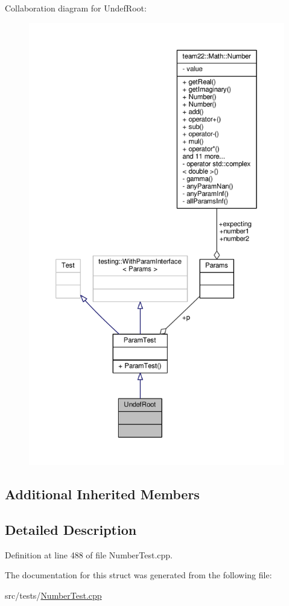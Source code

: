 Collaboration diagram for Undef\+Root\+:
\nopagebreak
\begin{figure}[H]
\begin{center}
\leavevmode
\includegraphics[height=550pt]{struct_undef_root__coll__graph}
\end{center}
\end{figure}
\subsection*{Additional Inherited Members}


\subsection{Detailed Description}


Definition at line 488 of file Number\+Test.\+cpp.



The documentation for this struct was generated from the following file\+:\begin{DoxyCompactItemize}
\item 
src/tests/\hyperlink{_number_test_8cpp}{Number\+Test.\+cpp}\end{DoxyCompactItemize}
